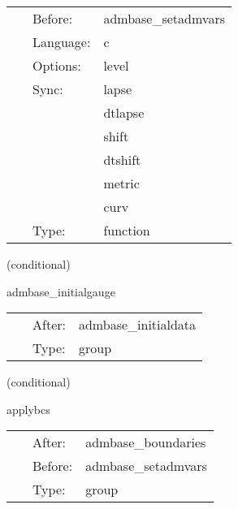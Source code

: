 \documentclass{article}
\begin{document}
 \begin{tabular*}{160mm}{cll} 
~ & Before:  & admbase\_setadmvars \\ 
~ & Language:  & c \\ 
~ & Options:  & level \\ 
~ & Sync:  & lapse \\ 
~& ~ &dtlapse\\ 
~& ~ &shift\\ 
~& ~ &dtshift\\ 
~& ~ &metric\\ 
~& ~ &curv\\ 
~ & Type:  & function \\ 
\end{tabular*} 


\vspace{5mm}

   (conditional) 

\hspace{5mm} admbase\_initialgauge 

\hspace{5mm}{\it schedule group for the adm initial gauge condition } 


\hspace{5mm}

 \begin{tabular*}{160mm}{cll} 
~ & After:  & admbase\_initialdata \\ 
~ & Type:  & group \\ 
\end{tabular*} 


\vspace{5mm}

   (conditional) 

\hspace{5mm} applybcs 

\hspace{5mm}{\it apply the boundary conditions of admbase } 


\hspace{5mm}

 \begin{tabular*}{160mm}{cll} 
~ & After:  & admbase\_boundaries \\ 
~ & Before:  & admbase\_setadmvars \\ 
~ & Type:  & group \\ 
\end{tabular*} 


\vspace{5mm}
\end{document}
